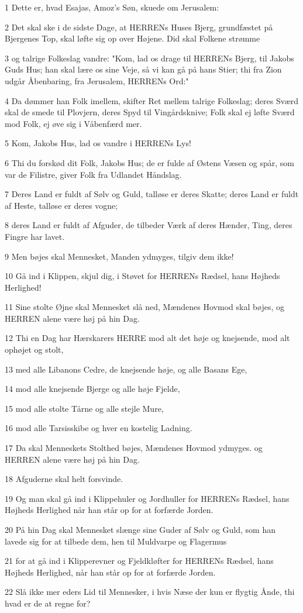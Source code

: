 \par 1 Dette er, hvad Esajas, Amoz's Søn, skuede om Jerusalem:
\par 2 Det skal ske i de sidste Dage, at HERRENs Huses Bjerg, grundfæstet på Bjergenes Top, skal løfte sig op over Højene. Did skal Folkene strømme
\par 3 og talrige Folkeslag vandre: "Kom, lad os drage til HERRENs Bjerg, til Jakobs Guds Hus; han skal lære os sine Veje, så vi kan gå på hans Stier; thi fra Zion udgår Åbenbaring, fra Jerusalem, HERRENs Ord:"
\par 4 Da dømmer han Folk imellem, skifter Ret mellem talrige Folkeslag; deres Sværd skal de smede til Plovjern, deres Spyd til Vingårdsknive; Folk skal ej løfte Sværd mod Folk, ej øve sig i Våbenfærd mer.
\par 5 Kom, Jakobs Hus, lad os vandre i HERRENs Lys!
\par 6 Thi du forskød dit Folk, Jakobs Hus; de er fulde af Østens Væsen og spår, som var de Filistre, giver Folk fra Udlandet Håndslag.
\par 7 Deres Land er fuldt af Sølv og Guld, talløse er deres Skatte; deres Land er fuldt af Heste, talløse er deres vogne;
\par 8 deres Land er fuldt af Afguder, de tilbeder Værk af deres Hænder, Ting, deres Fingre har lavet.
\par 9 Men bøjes skal Mennesket, Manden ydmyges, tilgiv dem ikke!
\par 10 Gå ind i Klippen, skjul dig, i Støvet for HERRENs Rædsel, hans Højheds Herlighed!
\par 11 Sine stolte Øjne skal Mennesket slå ned, Mændenes Hovmod skal bøjes, og HERREN alene være høj på hin Dag.
\par 12 Thi en Dag har Hærskarers HERRE mod alt det høje og knejsende, mod alt ophøjet og stolt,
\par 13 med alle Libanons Cedre, de knejsende høje, og alle Basans Ege,
\par 14 mod alle knejsende Bjerge og alle høje Fjelde,
\par 15 mod alle stolte Tårne og alle stejle Mure,
\par 16 mod alle Tarsisskibe og hver en kostelig Ladning.
\par 17 Da skal Menneskets Stolthed bøjes, Mændenes Hovmod ydmyges. og HERREN alene være høj på hin Dag.
\par 18 Afguderne skal helt forsvinde.
\par 19 Og man skal gå ind i Klippehuler og Jordhuller for HERRENs Rædsel, hans Højheds Herlighed når han står op for at forfærde Jorden.
\par 20 På hin Dag skal Mennesket slænge sine Guder af Sølv og Guld, som han lavede sig for at tilbede dem, hen til Muldvarpe og Flagermus
\par 21 for at gå ind i Klipperevner og Fjeldkløfter for HERRENs Rædsel, hans Højheds Herlighed, når han står op for at forfærde Jorden.
\par 22 Slå ikke mer eders Lid til Mennesker, i hvis Næse der kun er flygtig Ånde, thi hvad er de at regne for?

